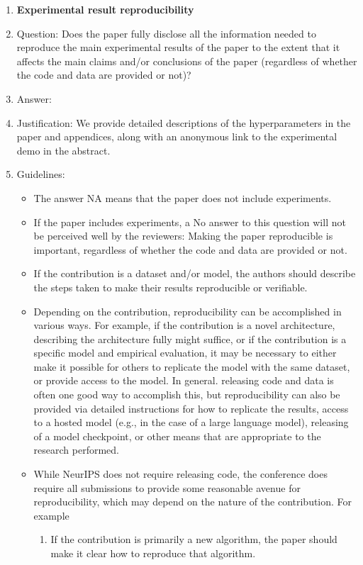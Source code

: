 \documentclass{article}
\begin{document}
\begin{enumerate}
    \item {\bf Experimental result reproducibility}
    \item[] Question: Does the paper fully disclose all the information needed to reproduce the main experimental results of the paper to the extent that it affects the main claims and/or conclusions of the paper (regardless of whether the code and data are provided or not)?
    \item[] Answer: \answerYes{} %
    \item[] Justification: We provide detailed descriptions of the hyperparameters in the paper and appendices, along with an anonymous link to the experimental demo in the abstract.
    \item[] Guidelines:
    \begin{itemize}
        \item The answer NA means that the paper does not include experiments.
        \item If the paper includes experiments, a No answer to this question will not be perceived well by the reviewers: Making the paper reproducible is important, regardless of whether the code and data are provided or not.
        \item If the contribution is a dataset and/or model, the authors should describe the steps taken to make their results reproducible or verifiable. 
        \item Depending on the contribution, reproducibility can be accomplished in various ways. For example, if the contribution is a novel architecture, describing the architecture fully might suffice, or if the contribution is a specific model and empirical evaluation, it may be necessary to either make it possible for others to replicate the model with the same dataset, or provide access to the model. In general. releasing code and data is often one good way to accomplish this, but reproducibility can also be provided via detailed instructions for how to replicate the results, access to a hosted model (e.g., in the case of a large language model), releasing of a model checkpoint, or other means that are appropriate to the research performed.
        \item While NeurIPS does not require releasing code, the conference does require all submissions to provide some reasonable avenue for reproducibility, which may depend on the nature of the contribution. For example
        \begin{enumerate}
            \item If the contribution is primarily a new algorithm, the paper should make it clear how to reproduce that algorithm.

\end{enumerate}
\end{itemize}
\end{enumerate}
\end{document}
